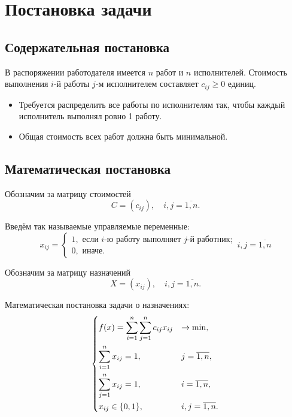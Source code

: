\section{Постановка задачи}

\subsection{Содержательная постановка}

В распоряжении работодателя имеется $n$ работ и $n$ исполнителей.
Стоимость выполнения $i$-й работы $j$-м исполнителем составляет $c_{ij} \geqslant 0$ единиц.

\begin{itemize}
	\item Требуется распределить все работы по исполнителям так, чтобы каждый исполнитель выполнял ровно 1 работу.
	\item Общая стоимость всех работ должна быть минимальной.
\end{itemize}

\subsection{Математическая постановка}

Обозначим за матрицу стоимостей
\begin{equation}
	C = (c_{ij}), \quad i, j = \overline{1, n}.
\end{equation}

Введём так называемые управляемые переменные:
\begin{equation}
	x_{ij} = \begin{cases}
		1, \text{ если } i \text{-ю работу выполняет } j \text{-й работник}; \\
		0, \text{ иначе}.
	\end{cases}
	i, j = \overline{1, n}
\end{equation}

Обозначим за матрицу назначений
\begin{equation}
	X = (x_{ij}), \quad  i, j = \overline{1, n}.
\end{equation}

Математическая постановка задачи о назначениях:
\begin{equation}
	\begin{dcases}
		f(x) = \sum_{i=1}^{n} \sum_{j=1}^n c_{ij}x_{ij} & \to \min, \\
		\sum_{i=1}^{n} x_{ij} = 1, & j = \overline{1, n}, \\
		\sum_{j=1}^{n} x_{ij} = 1, & i = \overline{1, n}, \\
		x_{ij} \in \{0, 1\}, & i, j = \overline{1, n}. \\
	\end{dcases}
\end{equation}

